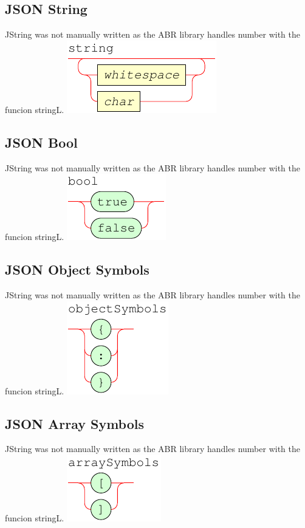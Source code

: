 \documentclass[a4paper]{article}
\begin{document}
\subsection{JSON String}
JString was not manually written as the ABR library handles number with the funcion stringL.
{\centering
   \includegraphics[scale=0.9]{syntax/string}
}

\subsection{JSON Bool}
JString was not manually written as the ABR library handles number with the funcion stringL.
{\centering
   \includegraphics[scale=0.9]{syntax/bool}
}

\subsection{JSON Object Symbols}
JString was not manually written as the ABR library handles number with the funcion stringL.
{\centering
   \includegraphics[scale=0.9]{syntax/objectSymbols}
}

\subsection{JSON Array Symbols}
JString was not manually written as the ABR library handles number with the funcion stringL.
{\centering
   \includegraphics[scale=0.9]{syntax/arraySymbols}
}
\end{document}
